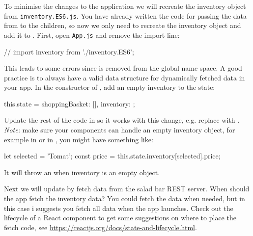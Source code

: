 \documentclass[fleqn, article, a4paper]{memoir}
\begin{document}
\begin{Assignments}
To minimise the changes to the application we will recreate the inventory object from \texttt{inventory.ES6.js}. You have already written the code for passing the data from  to the children, so now we only need to recreate the inventory object and add it to . First, open \texttt{App.js} and remove the import line:
\begin{Code}
// import inventory from './inventory.ES6';
\end{Code}
This leads to some errors since  is removed from the global name space. A good practice is to always have a valid data structure for dynamically fetched data in your app. In the constructor of , add an empty inventory to the state:
\begin{Code}
this.state = {shoppingBasket: [], inventory: {}};
\end{Code}
Update the rest of the code in  so it works with this change, e.g. replace  with . \emph{Note:} make sure your components can handle an empty inventory object, for example in  or in , you might have something like:
\begin{Code}
let selected = 'Tomat';
const price = this.state.inventory[selected].price;
\end{Code}
\noindent It will throw an  when inventory is an empty object.

\item Next we will update  by fetch data from the salad bar REST server. When should the app fetch the inventory data? You could fetch the data when needed, but in this case i suggests you fetch all data when the app launches. Check out the lifecycle of a React component to get some suggestions on where to place the fetch code, see \url{https://reactjs.org/docs/state-and-lifecycle.html}.


\end{Assignments}
\end{document}
